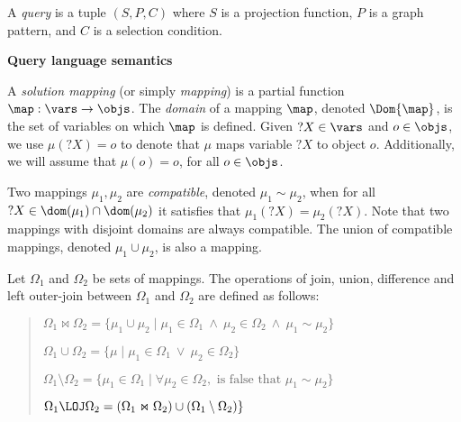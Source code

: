 A \emph{query} is a tuple $(S,P,C)$ where $S$ is a projection function, $P$ is a graph pattern, and $C$ is a selection condition. 
 
\smallskip 
\noindent
\textbf{Query language semantics}


A \textit{solution mapping} (or simply \textit{mapping}) is a partial function $\map: \vars \rightarrow \objs$. 
The \emph{domain} of a mapping $\map$, denoted $\Dom{\map}$, is the set of variables on which $\map$ is defined.
Given $?X \in \vars$ and $o \in \objs$, we use $\mu(?X) = o$ to denote that $\mu$ maps variable $?X$ to object $o$.  
Additionally, we will assume that $\mu(o)=o$, for all $o\in \objs$. 

Two mappings $\mu_1, \mu_2$ are \emph{compatible}, denoted $\mu_1 \sim \mu_2$, when for all $?X \in \dom(\mu_1) \cap \dom(\mu_2)$ it satisfies that $\mu_1(?X)=\mu_2(?X)$. 
Note that two mappings with disjoint domains are always compatible.
The union of compatible mappings, denoted $\mu_1 \cup \mu_2$, is also a mapping. 

Let $\Omega_1$ and $\Omega_2$ be sets of mappings.
The operations of join, union, difference and left outer-join between $\Omega_1$ and $\Omega_2$ are defined as follows:
\begin{verse}
$\Omega_1 \Join \Omega_2  = \{ \mu_1 \cup \mu_2 \mid \mu_1 \in \Omega_1 ~\land~ \mu_2 \in \Omega_2 ~\land~ \mu_1 \sim \mu_2 \}$

$\Omega_1 \cup \Omega_2  = \{ \mu \mid \mu_1 \in \Omega_1 ~\lor~ \mu_2 \in \Omega_2 \}$

$\Omega_1 \setminus \Omega_2  = \{ \mu _1 \in \Omega_1 \mid \forall \mu_2 \in \Omega_2, \text{ is false that } \mu_1 \sim \mu_2  \}$

$\Omega_1 \LOJ \Omega_2  = (\Omega_1 \Join \Omega_2) \cup (\Omega_1 \setminus \Omega_2) \}$
\end{verse}

